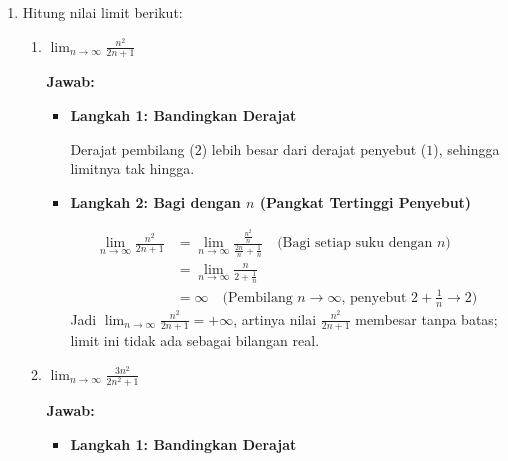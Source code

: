\documentclass[10pt,a4paper]{article}
\newcounter{eqblock}
\newcommand{\reseteq}{%
  \stepcounter{eqblock}%
  \setcounter{equation}{0}%
  \renewcommand{\theHequation}{\arabic{eqblock}.\arabic{equation}}%
}
\begin{document}
\begin{enumerate}
\begin{enumerate}
\begin{itemize}
\item \textbf{Langkah 3: Substitusi Ulang}

\reseteq
\begin{align}
\lim_{x \to 0} \frac{3x \tan x}{\sin x} &= \lim_{x \to 0} \frac{3x}{\cos x} = \frac{3 \cdot 0}{\cos 0} = \frac{0}{1} = 0
\end{align}
Jadi $\displaystyle\lim_{x \to 0} \frac{3x \tan x}{\sin x} = 0$.
\end{itemize}

\end{enumerate}

\item Hitung nilai limit berikut:
\begin{enumerate}

\item $\displaystyle\lim_{n \to \infty} \frac{n^2}{2n + 1}$

\textbf{Jawab:}
\begin{itemize}
\item \textbf{Langkah 1: Bandingkan Derajat}

Derajat pembilang ($2$) lebih besar dari derajat penyebut ($1$), sehingga limitnya tak hingga.

\item \textbf{Langkah 2: Bagi dengan $n$ (Pangkat Tertinggi Penyebut)}

\reseteq
\begin{align}
\lim_{n \to \infty} \frac{n^2}{2n + 1} &= \lim_{n \to \infty} \frac{\frac{n^2}{n}}{\frac{2n}{n} + \frac{1}{n}} \quad \text{(Bagi setiap suku dengan $n$)} \\
&= \lim_{n \to \infty} \frac{n}{2 + \frac{1}{n}} \\
&= \infty \quad \text{(Pembilang $n \to \infty$, penyebut $2 + \tfrac{1}{n} \to 2$)}
\end{align}
Jadi $\displaystyle\lim_{n \to \infty} \frac{n^2}{2n + 1} = +\infty$, artinya nilai $\frac{n^2}{2n+1}$ membesar tanpa batas; limit ini tidak ada sebagai bilangan real.
\end{itemize}

\item $\displaystyle\lim_{n \to \infty} \frac{3n^2}{2n^2 + 1}$

\textbf{Jawab:}
\begin{itemize}
\item \textbf{Langkah 1: Bandingkan Derajat}


\end{itemize}
\end{enumerate}
\end{enumerate}
\end{document}
